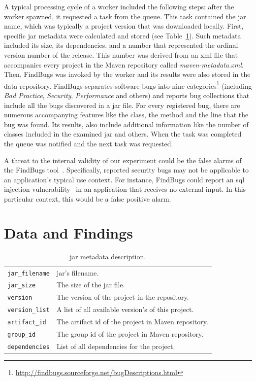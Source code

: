 \documentclass{sig-alternate}
\begin{document}
A typical processing cycle of a worker included the following steps: after
the worker spawned, it requested a task from the queue. This task contained
the {\sc jar} name, which was typically a project version that was downloaded locally.
First, specific {\sc jar} metadata were calculated and stored
(see Table~\ref{tbl:metadata-description}).
Such metadata included
its size, its dependencies, and a number that
represented the ordinal version number
of the release. This number was derived from an {\sc xml} file that
accompanies every project in the Maven repository called {\it
maven-metadata.xml}. Then, FindBugs was invoked by the worker and its results were
also stored in the data repository. 
FindBugs separates software bugs into nine
categories\footnote{\url{http://findbugs.sourceforge.net/bugDescriptions.html}}
(including {\it Bad Practice}, {\it Security}, {\it Performance} and others)
and reports bug collections that include all the bugs discovered in a
{\sc jar} file. For every registered bug, there are numerous accompanying features
like the class, the method and the line that the bug was found.
Its results, also include additional information like
the number of classes included in the examined {\sc jar}
and others.
When the task was completed the queue
was notified and the next task was requested.

A threat to the internal
validity of our experiment could be the false
alarms of the FindBugs tool~\cite{AP10, HP04}.
Specifically, reported security bugs may not
be applicable to an application's typical use context.
For instance, FindBugs could report an {\sc sql}
injection vulnerability~\cite{RL12}
in an application that receives no external input.
In this particular context, this would be a false
positive alarm.

\section{Data and Findings}
\label{sec:find}

\begin{table}
\centering
\begin{tabular}{l p{5.0cm}}
 \hline
\verb|jar_filename| & {\sc jar}'s filename. \\
\verb|jar_size| & The size of the {\sc jar} file. \\
\verb|version| & The version of the project in the repository. \\
\verb|version_list| & A list of all available version's of this project. \\
\verb|artifact_id| & The artifact {\sc id} of the project in Maven repository. \\
\verb|group_id| & The group {\sc id} of the project in Maven repository. \\
\verb|dependencies| & List of all dependencies for the project. \\
 \hline
 \end{tabular}
\caption{{\sc jar} metadata description.}
\label{tbl:metadata-description}
\end{table}
\end{document}
